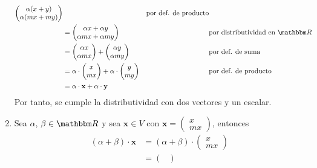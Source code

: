 \begin{examplebox}{}{}
\begin{enumerate}[label=\roman*), topsep=6pt, itemsep=0pt]
\begin{align*}
\begin{pmatrix}
                \alpha (x + y) \\
                \alpha (mx + my)
            \end{pmatrix} && \text{por def. de producto} \\
            & = \begin{pmatrix}
                \alpha x + \alpha y \\
                \alpha mx + \alpha my
            \end{pmatrix} && \text{por distributividad en $\RR$} \\
            & = \begin{pmatrix}
                \alpha x \\
                \alpha mx
            \end{pmatrix} + \begin{pmatrix}
                \alpha y \\
                \alpha my
            \end{pmatrix} && \text{por def. de suma} \\
            & = \alpha \cdot \begin{pmatrix}
                x \\
                mx
            \end{pmatrix} + \alpha \cdot \begin{pmatrix}
                y \\
                my
            \end{pmatrix} && \text{por def. de producto} \\
            & = \alpha \cdot \mathbf{x} + \alpha \cdot \mathbf{y}
        \end{align*}
        Por tanto, se cumple la distributividad con dos vectores y un escalar.
        \item Sea $\alpha$, $\beta \in \RR$ y sea $\mathbf{x} \in V$ con $\mathbf{x} = \begin{pmatrix}
            x \\
            mx
        \end{pmatrix}$, entonces
        \begin{align*}
            (\alpha + \beta) \cdot \mathbf{x} & = (\alpha + \beta) \cdot \begin{pmatrix}
                x \\
                mx
            \end{pmatrix} \\
            & = \begin{pmatrix}

\end{pmatrix}
\end{align*}
\end{enumerate}
\end{examplebox}

